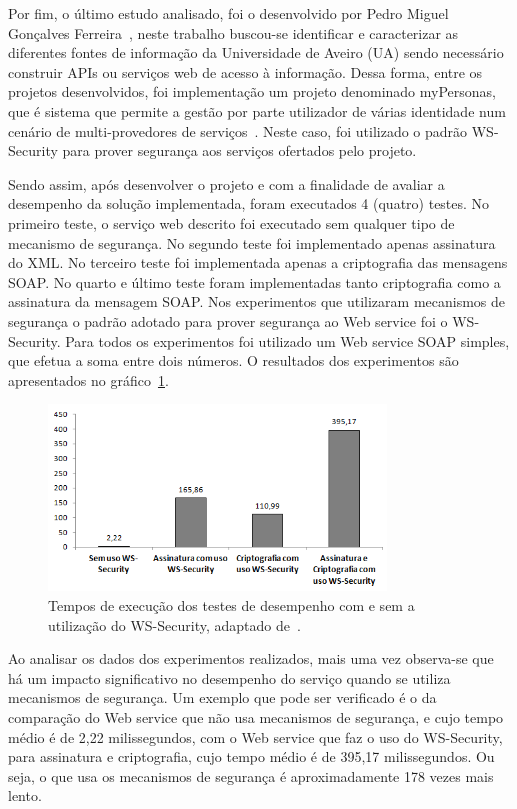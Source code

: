 Por fim, o último estudo analisado, foi o desenvolvido por  Pedro Miguel Gonçalves Ferreira~\cite{pedromiguel2012}, neste trabalho buscou-se identificar e caracterizar as diferentes fontes de informação da Universidade de Aveiro (UA) sendo necessário  construir APIs ou serviços web de acesso à informação. Dessa forma, entre os projetos desenvolvidos, foi implementação um projeto  denominado myPersonas, que é sistema que permite a gestão por parte utilizador de várias identidade num cenário de multi-provedores de serviços~\cite{pedromiguel2012}. Neste caso, foi utilizado o padrão WS-Security para prover segurança aos serviços ofertados pelo projeto.

Sendo assim, após desenvolver o projeto e com a finalidade de avaliar a desempenho da solução implementada, foram executados 4 (quatro) testes. No primeiro teste, o serviço web descrito foi executado sem qualquer tipo de mecanismo de segurança. No segundo teste foi implementado apenas assinatura do XML. No terceiro teste foi implementada apenas a criptografia das mensagens SOAP. No quarto e último teste foram implementadas tanto criptografia como a assinatura da mensagem SOAP. Nos experimentos que utilizaram mecanismos de segurança o padrão adotado para prover segurança ao Web service foi o WS-Security. Para todos os experimentos foi utilizado um Web service SOAP simples, que efetua a soma entre dois números. O resultados dos experimentos são apresentados no gráfico~\ref{fig:tempowssecurity}.


\begin{figure}[!htb]
    \centering
    \includegraphics[width=0.8\textwidth]{tempo_ws_security.png}
    \caption{Tempos de execução dos testes de desempenho com e sem a utilização do WS-Security, adaptado de~\cite{pedromiguel2012}.}
    \label{fig:tempowssecurity}
\end{figure}

Ao analisar os dados dos experimentos realizados, mais uma vez observa-se que há um impacto significativo no desempenho do serviço quando se utiliza mecanismos de segurança. Um exemplo que pode ser verificado é o da comparação do Web service que não usa mecanismos de segurança, e cujo tempo médio é de 2,22 milissegundos, com o Web service que faz o uso do WS-Security, para assinatura e criptografia, cujo tempo médio é de 395,17 milissegundos. Ou seja, o que usa os mecanismos de segurança é aproximadamente 178 vezes mais lento.

